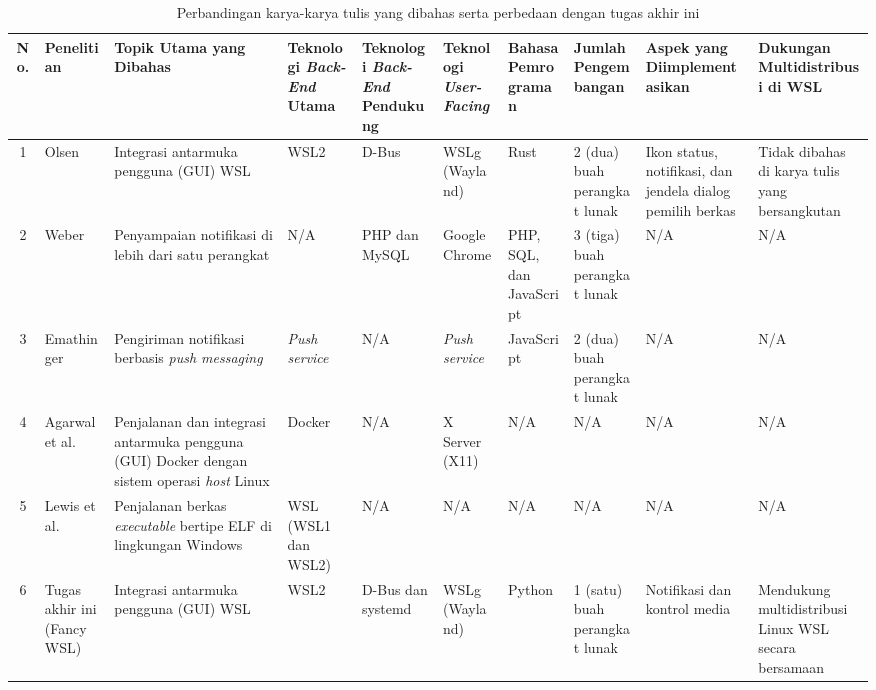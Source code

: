 \begin{landscape}
\begin{table}
    \centering
    \caption{Perbandingan karya-karya tulis yang dibahas serta perbedaan dengan tugas akhir ini}
    \label{tabel-ringkasan-perbandingan-di-tinjauan-pustaka}
    \begin{tabularx}{\linewidth}{|c|p{2cm}|p{3.5cm}|X|X|X|X|p{2cm}|p{2.5cm}|p{2.5cm}|} \hline
        \textbf{No.} & \textbf{Penelitian} & \textbf{Topik Utama yang Dibahas} & \textbf{Teknologi \textit{Back-End} Utama} & \textbf{Teknologi \textit{Back-End} Pendukung} & \textbf{Teknologi \textit{User-Facing}} & \textbf{Bahasa Pemrograman} & \textbf{Jumlah Pengembangan} & \textbf{Aspek yang Diimplementasikan} & \textbf{Dukungan Multidistribusi di WSL}\\ \hline
        1 & Olsen \cite{olsen-2022-through-the-wormhole} & Integrasi antarmuka pengguna (GUI) WSL & WSL2 & D-Bus & WSLg (Wayland) & Rust & 2 (dua) buah perangkat lunak & Ikon status, notifikasi, dan jendela dialog pemilih berkas & Tidak dibahas di karya tulis yang bersangkutan\\ \hline
        
        2 & Weber \cite{weber2015notifications} & Penyampaian notifikasi di lebih dari satu perangkat & N/A & PHP dan MySQL & Google Chrome & PHP, SQL, dan JavaScript & 3 (tiga) buah perangkat lunak & N/A & N/A\\ \hline
        
        3 & Emathinger \cite{emathinger2015unified} & Pengiriman notifikasi berbasis \textit{push messaging} & \textit{Push service} & N/A & \textit{Push service} & JavaScript & 2 (dua) buah perangkat lunak & N/A & N/A\\ \hline
        
        4 & Agarwal et al. \cite{agarwal2021gui} & Penjalanan dan integrasi antarmuka pengguna (GUI) Docker dengan sistem operasi \textit{host} Linux & Docker & N/A & X Server (X11) & N/A & N/A & N/A & N/A\\ \hline
        
        5 & Lewis et al. \cite{lewis2018memory} & Penjalanan berkas \textit{executable} bertipe ELF di lingkungan Windows & WSL (WSL1 dan WSL2) & N/A & N/A & N/A & N/A & N/A & N/A\\ \hline
        
        6 & Tugas akhir ini (FancyWSL) & Integrasi antarmuka pengguna (GUI) WSL & WSL2 & D-Bus dan systemd & WSLg (Wayland) & Python & 1 (satu) buah perangkat lunak & Notifikasi dan kontrol media & Mendukung multidistribusi Linux WSL secara bersamaan\\ \hline
    \end{tabularx}
\end{table}
\end{landscape}

